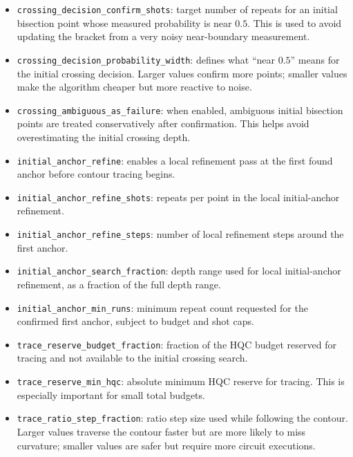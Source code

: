 \begin{itemize}
    \item \texttt{crossing\_decision\_confirm\_shots}: target number of repeats
    for an initial bisection point whose measured probability is near \(0.5\).
    This is used to avoid updating the bracket from a very noisy near-boundary
    measurement.

    \item \texttt{crossing\_decision\_probability\_width}: defines what
    ``near \(0.5\)'' means for the initial crossing decision.  Larger values
    confirm more points; smaller values make the algorithm cheaper but more
    reactive to noise.

    \item \texttt{crossing\_ambiguous\_as\_failure}: when enabled, ambiguous
    initial bisection points are treated conservatively after confirmation.
    This helps avoid overestimating the initial crossing depth.

    \item \texttt{initial\_anchor\_refine}: enables a local refinement pass at
    the first found anchor before contour tracing begins.

    \item \texttt{initial\_anchor\_refine\_shots}: repeats per point in the
    local initial-anchor refinement.

    \item \texttt{initial\_anchor\_refine\_steps}: number of local refinement
    steps around the first anchor.

    \item \texttt{initial\_anchor\_search\_fraction}: depth range used for local
    initial-anchor refinement, as a fraction of the full depth range.

    \item \texttt{initial\_anchor\_min\_runs}: minimum repeat count requested
    for the confirmed first anchor, subject to budget and shot caps.

    \item \texttt{trace\_reserve\_budget\_fraction}: fraction of the HQC budget
    reserved for tracing and not available to the initial crossing search.

    \item \texttt{trace\_reserve\_min\_hqc}: absolute minimum HQC reserve for
    tracing.  This is especially important for small total budgets.

    \item \texttt{trace\_ratio\_step\_fraction}: ratio step size used while
    following the contour.  Larger values traverse the contour faster but are
    more likely to miss curvature; smaller values are safer but require more
    circuit executions.


\end{itemize}
